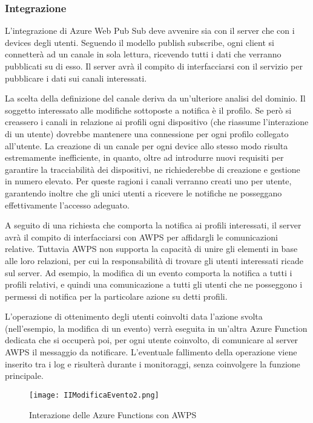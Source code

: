 \subsubsection{Integrazione}

L’integrazione di Azure Web Pub Sub deve avvenire sia con il server che con i devices degli utenti. Seguendo il modello publish subscribe, ogni client si connetterà ad un canale in sola lettura, ricevendo tutti i dati che verranno pubblicati su di esso. Il server avrà il compito di interfacciarsi con il servizio per pubblicare i dati sui canali interessati.

La scelta della definizione del canale deriva da un’ulteriore analisi del dominio. 
Il soggetto interessato alle modifiche sottoposte a notifica è il profilo. 
Se però si creassero i canali in relazione ai profili ogni dispositivo (che riassume l’interazione di un utente) dovrebbe mantenere una connessione per ogni profilo collegato all’utente. La creazione di un canale per ogni device allo stesso modo risulta estremamente inefficiente, in quanto, oltre ad introdurre nuovi requisiti per garantire la tracciabilità dei dispositivi, ne richiederebbe di creazione e gestione in numero elevato. Per queste ragioni i canali verranno creati uno per utente, garantendo inoltre che gli unici utenti a ricevere le notifiche ne posseggano effettivamente l’accesso adeguato.

A seguito di una richiesta che comporta la notifica ai profili interessati, il server avrà il compito di interfacciarsi con AWPS per affidargli le comunicazioni relative. Tuttavia AWPS non supporta la capacità di unire gli elementi in base alle loro relazioni, per cui la responsabilità di trovare gli utenti interessati ricade sul server. 
Ad esempio, la modifica di un evento comporta la notifica a tutti i profili relativi, e quindi una comunicazione a tutti gli utenti che ne posseggono i permessi di notifica per la particolare azione su detti profili. 

L’operazione di ottenimento degli utenti coinvolti data l’azione svolta (nell’esempio, la modifica di un evento) verrà eseguita in un’altra Azure Function dedicata che si occuperà poi, per ogni utente coinvolto, di comunicare  al server AWPS il messaggio da notificare. L’eventuale fallimento della operazione viene inserito tra i log e risulterà durante i monitoraggi, senza coinvolgere la funzione principale.

		
\begin{figure}[h!]
    \centering
    \texttt{[image: IIModificaEvento2.png]}
    \caption{Interazione delle Azure Functions con AWPS}
\end{figure}	

